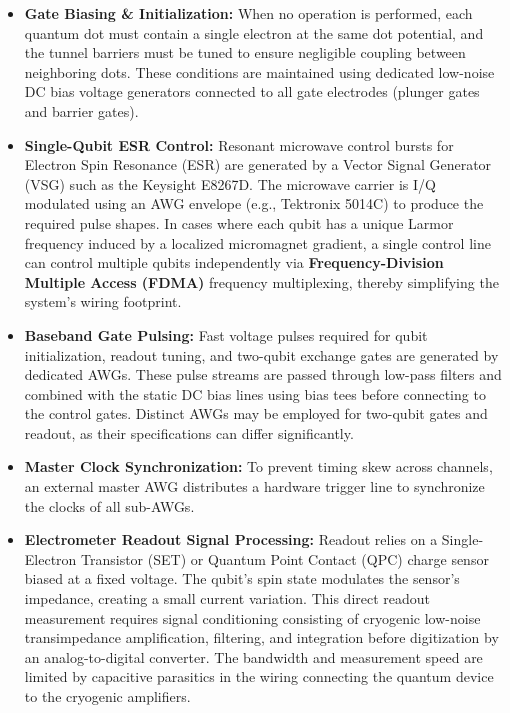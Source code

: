 \documentclass[
]{article}
\providecommand{\tightlist}{%
  \setlength{\itemsep}{0pt}\setlength{\parskip}{0pt}}
\begin{document}
\begin{itemize}
\tightlist
\item
  \textbf{Gate Biasing \& Initialization:} When no operation is
  performed, each quantum dot must contain a single electron at the same
  dot potential, and the tunnel barriers must be tuned to ensure
  negligible coupling between neighboring dots. These conditions are
  maintained using dedicated low-noise DC bias voltage generators
  connected to all gate electrodes (plunger gates and barrier gates).
\item
  \textbf{Single-Qubit ESR Control:} Resonant microwave control bursts
  for Electron Spin Resonance (ESR) are generated by a Vector Signal
  Generator (VSG) such as the Keysight E8267D. The microwave carrier is
  I/Q modulated using an AWG envelope (e.g., Tektronix 5014C) to produce
  the required pulse shapes. In cases where each qubit has a unique
  Larmor frequency induced by a localized micromagnet gradient, a single
  control line can control multiple qubits independently via
  \textbf{Frequency-Division Multiple Access (FDMA)} frequency
  multiplexing, thereby simplifying the system's wiring footprint.
\item
  \textbf{Baseband Gate Pulsing:} Fast voltage pulses required for qubit
  initialization, readout tuning, and two-qubit exchange gates are
  generated by dedicated AWGs. These pulse streams are passed through
  low-pass filters and combined with the static DC bias lines using bias
  tees before connecting to the control gates. Distinct AWGs may be
  employed for two-qubit gates and readout, as their specifications can
  differ significantly.
\item
  \textbf{Master Clock Synchronization:} To prevent timing skew across
  channels, an external master AWG distributes a hardware trigger line
  to synchronize the clocks of all sub-AWGs.
\item
  \textbf{Electrometer Readout Signal Processing:} Readout relies on a
  Single-Electron Transistor (SET) or Quantum Point Contact (QPC) charge
  sensor biased at a fixed voltage. The qubit's spin state modulates the
  sensor's impedance, creating a small current variation. This direct
  readout measurement requires signal conditioning consisting of
  cryogenic low-noise transimpedance amplification, filtering, and
  integration before digitization by an analog-to-digital converter. The
  bandwidth and measurement speed are limited by capacitive parasitics
  in the wiring connecting the quantum device to the cryogenic
  amplifiers.
\end{itemize}
\end{document}
